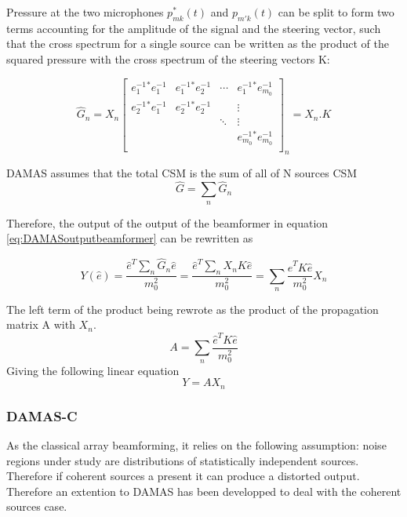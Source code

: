 Pressure at the two microphones $p^{*}_{mk}(t)$ and $p_{m'k}(t)$ can be split to form two terms accounting for the amplitude of the signal and the steering vector, such that the cross spectrum for a single source can be written as the product of the squared pressure with the cross spectrum of the steering vectors K:

\begin{equation}
\hat{G}_{n}= X_{n} 
\begin{bmatrix} 
      e_{1}^{-1}^{*}e_{1}^{-1} & e_{1}^{-1}^{*}e_{2}^{-1} & \cdots &   e_{1}^{-1}^{*}e_{m_{0}}^{-1}\\
      e_{2}^{-1}^{*}e_{1}^{-1} & e_{2}^{-1}^{*}e_{2}^{-1} &       &  \vdots\\
         &     & \ddots &   \vdots\\
       &     &   &   e_{m_{0}}^{-1}^{*}e_{m_{0}}^{-1}\\
    \end{bmatrix}_{ n}= X_{n}.K 
\end{equation}   

DAMAS assumes that the total CSM is the sum of all of N sources CSM
\begin{equation}
    \hat{G}=\sum_{n}\hat{G}_{n}
\end{equation}  

Therefore, the output of the output of the beamformer in equation \ref{eq:DAMASoutputbeamformer} can be rewritten as

\begin{equation}
    Y(\hat{e})=\frac{\hat{e}^{T}\sum_{n}\hat{G}_{n}\hat{e}}{m_0^2}=\frac{\hat{e}^{T}\sum_{n}X_{n}K\hat{e}}{m_0^2}=\sum_{n}\frac{\hat{e}^{T}K\hat{e}}{m_0^2} X_{n}
\end{equation}

The left term of the product being rewrote as the product of the propagation matrix A with $X_{n}$.
\begin{equation}
    A=\sum_{n}\frac{\hat{e}^{T}K\hat{e}}{m_0^2}
\end{equation}
Giving the following linear equation
\begin{equation}
    Y = A X_{n}
\end{equation}


\subsubsection{DAMAS-C}

As the classical array beamforming, it relies on the following assumption: noise regions under study are distributions of statistically independent sources. Therefore if coherent sources a present it can produce a distorted output. Therefore an extention to DAMAS has been developped to deal with the coherent sources case.


